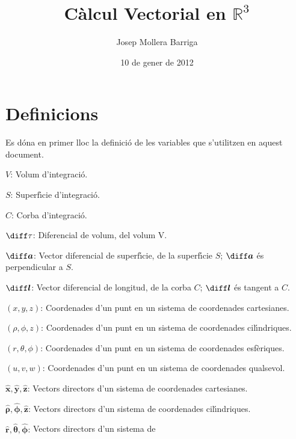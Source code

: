 \documentclass[catalan,a4paper,twoside,11pt]{article}
\begin{document}
\title{C\`{a}lcul Vectorial en $\mathbb{R}^3$}
\author{Josep Mollera Barriga}
\date{10 de gener de 2012}
\maketitle



\section{Definicions}

Es d\'{o}na  en primer lloc la definici\'{o} de les variables que s'utilitzen en aquest document.

\begin{list}{}
{\setlength{\labelwidth}{16mm}
\setlength{\leftmargin}{18mm}\setlength{\labelsep}{2mm}}
   \item[$V$:] Volum d'integraci\'{o}.
   \item[$S$:] Superf\'{\i}cie d'integraci\'{o}.
   \item[$C$:] Corba d'integraci\'{o}.
   \item[$\diff\tau$:] Diferencial de volum, del volum V.
   \item[$\boldsymbol{\diff a}$:] Vector diferencial de superf\'{\i}cie, de la superf\'{\i}cie
   $S$; $\boldsymbol{\diff a}$ \'{e}s perpendicular a $S$.
   \item[$\boldsymbol{\diff l}$:] Vector diferencial de longitud, de la corba
   $C$; $\boldsymbol{\diff l}$ \'{e}s tangent a $C$.
   \item[$(x,y,z)$:] Coordenades d'un punt en un sistema de
   coordenades cartesianes.
   \item[$(\rho,\phi,z)$:] Coordenades d'un punt en un sistema de
   coordenades cil\'{\i}ndriques.
   \item[$(r,\theta,\phi)$:] Coordenades d'un punt en un sistema de
   coordenades esf\`{e}riques.
   \item[$(u,v,w)$:] Coordenades d'un punt en un sistema de
   coordenades qualsevol.
   \item[$\boldsymbol{\hat{x}},\boldsymbol{\hat{y}},\boldsymbol{\hat{z}}$:]
   Vectors directors d'un sistema de  coordenades
   cartesianes.
   \item[$\boldsymbol{\hat{\rho}},\boldsymbol{\hat{\phi}},\boldsymbol{\hat{z}}$:] Vectors directors d'un sistema de
   coordenades cil\'{\i}ndriques.
   \item[$\boldsymbol{\hat{r}},\boldsymbol{\hat{\theta}},\boldsymbol{\hat{\phi}}$:] Vectors directors d'un sistema de

\end{list}
\end{document}
